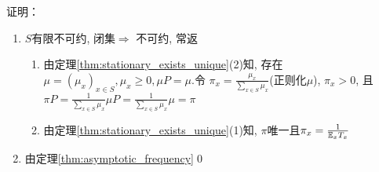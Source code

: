 证明：
\begin{enumerate}
    \item $S$有限不可约, 闭集$\Rightarrow$ 不可约, 常返
    \begin{enumerate}
        \item 由定理\ref{thm:stationary_exists_unique}(2)知, 存在$\mu=(\mu_x)_{x\in S},\mu_x\geq 0, \mu P=\mu$.令 $\pi_x=\frac{\mu_x}{\sum_{x\in S}\mu_x}$(正则化$\mu$), $\pi_x>0$, 且 $\pi P=\frac{1}{\sum_{x\in S}\mu_x}\mu P=\frac{1}{\sum_{x\in S}\mu_x}\mu=\pi$
        \item 由定理\ref{thm:stationary_exists_unique}(1)知, $\pi$唯一且$\pi_x=\frac{1}{\mathbb E_xT_x}$
    \end{enumerate}
    \item 由定理\ref{thm:asymptotic_frequency}\qed
\end{enumerate}
\newpage
